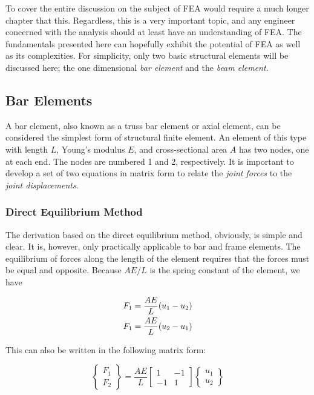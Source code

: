 \documentclass[a4paper,openany,nobib]{tufte-book}
\begin{document}
{{To cover the entire discussion on the subject of FEA would require a
much longer chapter that this. Regardless, this is a very important
topic, and any engineer concerned with the analysis should at least have
an understanding of FEA. The fundamentals presented here can hopefully
exhibit the potential of FEA as well as its complexities. For
simplicity, only two basic structural elements will be discussed here;
the one dimensional \emph{bar element} and the \emph{beam element}.

\subsection{Bar Elements}
\label{bar-elements}
A bar element, also known as a truss bar element or axial element, can
be considered the simplest form of structural finite element. An element
of this type with length \(L\), Young's modulus \(E\), and cross-sectional
area \(A\) has two nodes, one at each end. The nodes are numbered 1 and 2,
respectively. It is important to develop a set of two equations in
matrix form to relate the \emph{joint forces} to the \emph{joint displacements}.

\subsubsection{Direct Equilibrium Method}
\label{direct-equilibrium-method}
The derivation based on the direct equilibrium method, obviously, is
simple and clear. It is, however, only practically applicable to bar and
frame elements. The equilibrium of forces along the length of the
element requires that the forces must be equal and opposite. Because
\(AE / L\) is the spring constant of the element, we have

$$\begin{gathered}
    F_1 = \frac{AE}{L}(u_1 - u_2) \hfill \\
    F_1 = \frac{AE}{L}(u_2 - u_1) \hfill \\ 
  \end{gathered}$$

This can also be written in the following matrix form:

$$\left\{
    \begin{array}{*{20}{c}}
      F_1 \\ 
      F_2 
    \end{array} \right\} = \frac{AE}{L}\left[
    \begin{array}{*{20}{c}}
      1 & -1 \\ 
     -1 & 1 
   \end{array} \right]\left\{
    \begin{array}{*{20}{c}}
    u_1 \\ 
    u_2 
   \end{array} \right\}$$

}}
\end{document}
